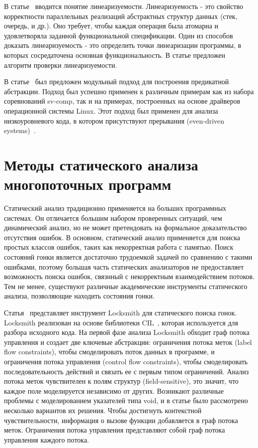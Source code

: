 В статье~\cite{Vafeiadis:2010} вводится понятие линеаризуемости.
Линеаризуемость - это свойство корректности параллельных реализаций абстрактных структур данных (стек, очередь, и др.).
Оно требует, чтобы каждая операция была атомарна и удовлетворяла заданной функциональной спецификации. Один из способов доказать линеаризуемость - это определить точки линеаризации программы, в которых сосредаточена основная функциональность.
В статье предложен алгоритм проверки линеаризуемости.

В статье~\cite{Kusano:2016:FCT} был предложен модульный подход для построения предикатной абстракции.
Подход был успешно применен к различным примерам как из набора соревнований sv-comp, так и на примерах, построенных на основе драйверов операционной системы Linux.
Этот подход был применен для анализа низкоуровневого кода, в котором присутствуют прерывания (even-driven systems)~\cite{Sung:2017}.

\section{Методы статического анализа многопоточных программ}
\label{rw:static}

Статический анализ традиционно применяется на больших программных системах.
Он отличается большим набором проверенных ситуаций, чем динамический анализ, но не может претендовать на формальное доказательство отсутствия ошибок.
В основном, статический анализ применяется для поиска простых классов ошибок, таких как некорректная работа с памятью.
Поиск состояний гонки является достаточно трудоемкой задачей по сравнению с такими ошибками, поэтому большая часть статических анализаторов не предоставляет возможность поиска ошибок, связнный с некорректным взаимодействием потоков.
Тем не менее, существуют различные академические инструменты статического анализа, позволяющие находить состояния гонки.

Статья~\cite{Pratikakis:2011} представляет инструмент Locksmith для статического поиска гонок.
Locksmith реализован на основе библиотеки CIL~\cite{CIL}, которая используется для разбора исходного кода.
На первой фазе анализа Locksmith обходит граф потока управления и создает две ключевые абстракции: ограничения потока меток (label flow constraints), чтобы смоделировать поток данных в программе, и ограничения потока управления (control flow constraints), чтобы смоделировать последовательность действий и связать ее с первым типом ограничений.
Анализ потока меток чувствителен к полям структур (field-sensitive), это значит, что каждое поле моделируется независимо от других.
Возникают различные проблемы с моделированием указателей типа void, и в статье было рассмотрено несколько вариантов их решения.
Чтобы достигнуть контекстной чувствительности, информация о вызове функции добавляется в граф потока меток.
Ограничения потока управления представляют собой граф потока управления каждого потока.

